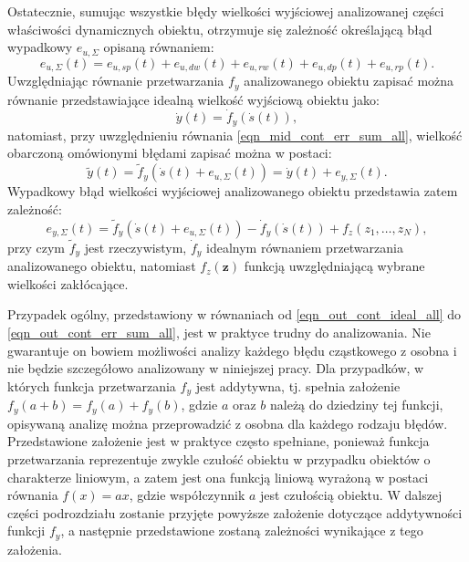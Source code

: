Ostatecznie, sumując wszystkie błędy wielkości wyjściowej analizowanej części właściwości dynamicznych obiektu, otrzymuje się zależność określającą błąd wypadkowy $e_{u,\Sigma}$ opisaną równaniem:
\begin{equation}
e_{u,\Sigma} \left( t \right) = e_{u,sp} \left( t \right) + e_{u,dw} \left( t \right) + e_{u,rw} \left( t \right) + e_{u,dp} \left( t \right) + e_{u,rp} \left( t \right) \label{eqn_mid_cont_err_sum_all}.
\end{equation}
Uwzględniając równanie przetwarzania $f_{y}$ analizowanego obiektu zapisać można równanie przedstawiające idealną wielkość wyjściową obiektu jako:
\begin{equation}
\dot{y} \left( t \right) = \dot{f}_{y} \left( \dot{s} \left( t \right) \right) \label{eqn_out_cont_ideal_all},
\end{equation}
natomiast, przy uwzględnieniu równania \eqref{eqn_mid_cont_err_sum_all}, wielkość obarczoną omówionymi błędami zapisać można w postaci:
\begin{equation}
\tilde{y} \left( t \right) = \tilde{f}_{y} \left( \dot{s} \left( t \right) + e_{u,\Sigma} \left( t \right) \right) = \dot{y} \left( t \right) + e_{y,\Sigma} \left( t \right) \label{eqn_out_cont_real_all}.
\end{equation}
Wypadkowy błąd wielkości wyjściowej analizowanego obiektu przedstawia zatem zależność:
\begin{equation}
e_{y,\Sigma} \left( t \right) = \tilde{f}_{y} \left( \dot{s} \left( t \right) + e_{u,\Sigma} \left( t \right) \right) - \dot{f}_{y} \left( \dot{s} \left( t \right) \right) + f_{z} \left( z_{1}, \hdots, z_{N} \right) \label{eqn_out_cont_err_sum_all},
\end{equation}
przy czym $\tilde{f}_{y}$ jest rzeczywistym, $\dot{f}_{y}$ idealnym równaniem przetwarzania analizowanego obiektu, natomiast $f_{z}(\mathbf{z})$ funkcją uwzględniającą wybrane wielkości zakłócające.

Przypadek ogólny, przedstawiony w równaniach od \eqref{eqn_out_cont_ideal_all} do \eqref{eqn_out_cont_err_sum_all}, jest w praktyce trudny do analizowania. Nie gwarantuje on bowiem możliwości analizy każdego błędu cząstkowego z osobna i nie będzie szczegółowo analizowany w niniejszej pracy. Dla przypadków, w których funkcja przetwarzania $f_{y}$ jest addytywna, tj. spełnia założenie $f_{y}(a + b) = f_{y}(a) + f_{y}(b)$, gdzie $a$ oraz $b$ należą do dziedziny tej funkcji, opisywaną analizę można przeprowadzić z osobna dla każdego rodzaju błędów. Przedstawione założenie jest w praktyce często spełniane, ponieważ funkcja przetwarzania reprezentuje zwykle czułość obiektu w przypadku obiektów o charakterze liniowym, a zatem jest ona funkcją liniową wyrażoną w postaci równania $f(x) = ax$, gdzie współczynnik $a$ jest czułością obiektu. W dalszej części podrozdziału zostanie przyjęte powyższe założenie dotyczące addytywności funkcji $f_{y}$, a następnie przedstawione zostaną zależności wynikające z tego założenia.

